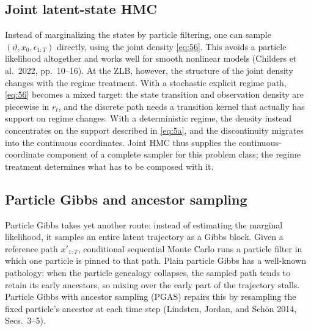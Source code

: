 \documentclass[11pt]{article}
\begin{document}
\subsection{Joint latent-state HMC}\label{sec:joint-hmc}

Instead of marginalizing the states by particle filtering, one can sample
$(\vartheta,x_0,\epsilon_{1:T})$ directly, using the joint density
\eqref{eq:56}. This avoids a particle likelihood altogether and works well for
smooth nonlinear models (Childers et al.\ 2022, pp.~10--16). At the ZLB,
however, the structure of the joint density changes with the regime treatment.
With a stochastic explicit regime path, \eqref{eq:56} becomes a mixed target:
the state transition and observation density are piecewise in $r_t$, and the
discrete path needs a transition kernel that actually has support on regime
changes. With a deterministic regime, the density instead concentrates on the
support described in \eqref{eq:5a}, and the discontinuity migrates into the
continuous coordinates. Joint HMC thus supplies the continuous-coordinate
component of a complete sampler for this problem class; the regime treatment
determines what has to be composed with it.

\subsection{Particle Gibbs and ancestor sampling}\label{sec:pgas}

Particle Gibbs takes yet another route: instead of estimating the marginal
likelihood, it samples an entire latent trajectory as a Gibbs block. Given a
reference path $x'_{1:T}$, conditional sequential Monte Carlo runs a particle
filter in which one particle is pinned to that path. Plain particle Gibbs has a
well-known pathology: when the particle genealogy collapses, the sampled path
tends to retain its early ancestors, so mixing over the early part of the
trajectory stalls. Particle Gibbs with ancestor sampling (PGAS) repairs this by
resampling the fixed particle's ancestor at each time step (Lindsten, Jordan,
and Sch\"on 2014, Secs.~3--5).
\end{document}
